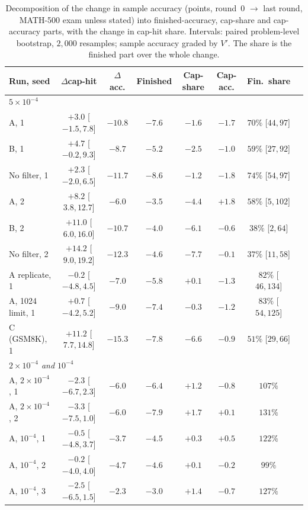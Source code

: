 \documentclass[runningheads]{llncs}
\begin{document}
\begin{table}[!htb]
\caption{Decomposition of the change in sample accuracy (points, round~0 $\to$
last round, MATH-500 exam unless stated) into finished-accuracy, cap-share and
cap-accuracy parts, with the change in cap-hit share. Intervals: paired
problem-level bootstrap, $2{,}000$ resamples; sample accuracy graded by $V'$. The share is the finished part
over the whole change.}
\label{tab:decomp}
\centering
\scriptsize
\setlength{\tabcolsep}{2pt}
\begin{tabular}{lccccccc}
\toprule
Run, seed & $\Delta$cap-hit & $\Delta$acc. & Finished & Cap-share & Cap-acc. & Fin.\ share \\
\midrule
\multicolumn{7}{l}{\emph{$5\times10^{-4}$}} \\
A, 1 & $+3.0$ [$-1.5,7.8$] & $-10.8$ & $-7.6$ & $-1.6$ & $-1.7$ & $70\%$ [$44,97$] \\
B, 1 & $+4.7$ [$-0.2,9.3$] & $-8.7$ & $-5.2$ & $-2.5$ & $-1.0$ & $59\%$ [$27,92$] \\
No filter, 1 & $+2.3$ [$-2.0,6.5$] & $-11.7$ & $-8.6$ & $-1.2$ & $-1.8$ & $74\%$ [$54,97$] \\
A, 2 & $+8.2$ [$3.8,12.7$] & $-6.0$ & $-3.5$ & $-4.4$ & $+1.8$ & $58\%$ [$5,102$] \\
B, 2 & $+11.0$ [$6.0,16.0$] & $-10.7$ & $-4.0$ & $-6.1$ & $-0.6$ & $38\%$ [$2,64$] \\
No filter, 2 & $+14.2$ [$9.0,19.2$] & $-12.3$ & $-4.6$ & $-7.7$ & $-0.1$ & $37\%$ [$11,58$] \\
A replicate, 1 & $-0.2$ [$-4.8,4.5$] & $-7.0$ & $-5.8$ & $+0.1$ & $-1.3$ & $82\%$ [$46,134$] \\
A, 1024 limit, 1 & $+0.7$ [$-4.2,5.2$] & $-9.0$ & $-7.4$ & $-0.3$ & $-1.2$ & $83\%$ [$54,125$] \\
C (GSM8K), 1 & $+11.2$ [$7.7,14.8$] & $-15.3$ & $-7.8$ & $-6.6$ & $-0.9$ & $51\%$ [$29,66$] \\
\multicolumn{7}{l}{\emph{$2\times10^{-4}$ and $10^{-4}$}} \\
A, $2\times10^{-4}$, 1 & $-2.3$ [$-6.7,2.3$] & $-6.0$ & $-6.4$ & $+1.2$ & $-0.8$ & $107\%$ \\
A, $2\times10^{-4}$, 2 & $-3.3$ [$-7.5,1.0$] & $-6.0$ & $-7.9$ & $+1.7$ & $+0.1$ & $131\%$ \\
A, $10^{-4}$, 1 & $-0.5$ [$-4.8,3.7$] & $-3.7$ & $-4.5$ & $+0.3$ & $+0.5$ & $122\%$ \\
A, $10^{-4}$, 2 & $-0.2$ [$-4.0,4.0$] & $-4.7$ & $-4.6$ & $+0.1$ & $-0.2$ & $99\%$ \\
A, $10^{-4}$, 3 & $-2.5$ [$-6.5,1.5$] & $-2.3$ & $-3.0$ & $+1.4$ & $-0.7$ & $127\%$ \\
\bottomrule
\end{tabular}
\end{table}
\end{document}
